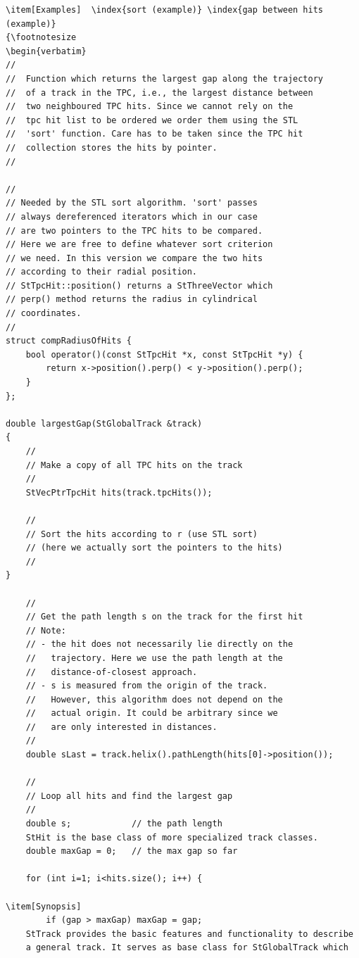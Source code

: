 \begin{Entry}
\begin{Entry}
{\begin{verbatim}
\item[Examples]  \index{sort (example)} \index{gap between hits (example)}
{\footnotesize
\begin{verbatim}
//
//  Function which returns the largest gap along the trajectory
//  of a track in the TPC, i.e., the largest distance between
//  two neighboured TPC hits. Since we cannot rely on the
//  tpc hit list to be ordered we order them using the STL
//  'sort' function. Care has to be taken since the TPC hit
//  collection stores the hits by pointer.
//

//
// Needed by the STL sort algorithm. 'sort' passes
// always dereferenced iterators which in our case
// are two pointers to the TPC hits to be compared.
// Here we are free to define whatever sort criterion
// we need. In this version we compare the two hits
// according to their radial position.
// StTpcHit::position() returns a StThreeVector which
// perp() method returns the radius in cylindrical
// coordinates.
//
struct compRadiusOfHits {
    bool operator()(const StTpcHit *x, const StTpcHit *y) {
        return x->position().perp() < y->position().perp();
    }
};

double largestGap(StGlobalTrack &track)
{
    //
    // Make a copy of all TPC hits on the track
    //
    StVecPtrTpcHit hits(track.tpcHits());

    //
    // Sort the hits according to r (use STL sort)
    // (here we actually sort the pointers to the hits)
    //
}  

    //
    // Get the path length s on the track for the first hit
    // Note:
    // - the hit does not necessarily lie directly on the
    //   trajectory. Here we use the path length at the
    //   distance-of-closest approach.
    // - s is measured from the origin of the track.
    //   However, this algorithm does not depend on the
    //   actual origin. It could be arbitrary since we
    //   are only interested in distances.
    //
    double sLast = track.helix().pathLength(hits[0]->position());

    //
    // Loop all hits and find the largest gap
    //
    double s;            // the path length
    StHit is the base class of more specialized track classes.
    double maxGap = 0;   // the max gap so far

    for (int i=1; i<hits.size(); i++) {
    
\item[Synopsis] 
        if (gap > maxGap) maxGap = gap;
    StTrack provides the basic features and functionality to describe
    a general track. It serves as base class for StGlobalTrack which


\end{verbatim}}
\end{Entry}
\end{Entry}
